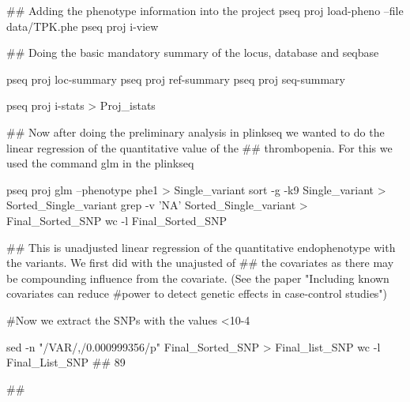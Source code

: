 ## Adding the phenotype information into the project
pseq proj load-pheno --file data/TPK.phe 
pseq proj i-view

## Doing the basic mandatory summary of the locus, database and seqbase

pseq proj loc-summary
pseq proj ref-summary 
pseq proj seq-summary

 pseq proj i-stats > Proj_istats
 
 ## Now after doing the preliminary analysis in plinkseq we wanted to do the linear regression of the quantitative value of the ## thrombopenia. For this we used the command glm in the plinkseq
 
 pseq proj glm --phenotype phe1 > Single_variant
 sort -g -k9 Single_variant > Sorted_Single_variant
 grep -v 'NA' Sorted_Single_variant > Final_Sorted_SNP
 wc -l Final_Sorted_SNP

## This is unadjusted linear regression of the quantitative endophenotype with the variants. We first did with the unajusted of ## the covariates as there may be compounding influence from the covariate. (See the paper "Including known covariates can  reduce #power to detect genetic effects in case-control studies")

#Now we extract the SNPs with the values <10-4

 sed -n "/VAR/,/0.000999356/p" Final_Sorted_SNP > Final_list_SNP
 wc -l Final_List_SNP  ## 89
 
 ##



 
